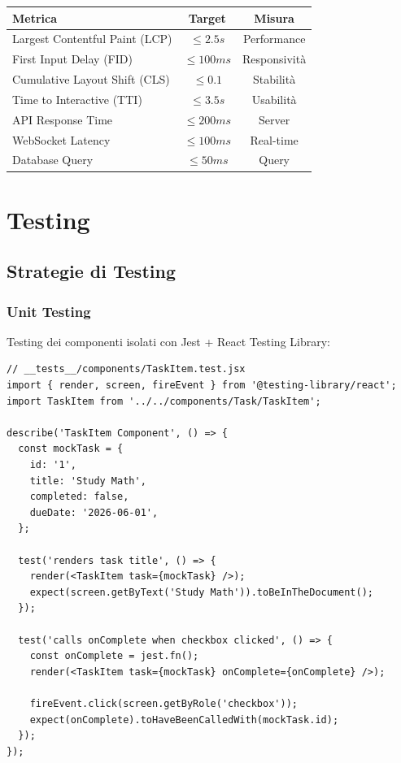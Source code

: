 \documentclass[12pt,a4paper]{report}
\begin{document}
\begin{table}[H]
    \centering
    \begin{tabular}{|l|c|c|}
        \hline
        \textbf{Metrica} & \textbf{Target} & \textbf{Misura} \\
        \hline
        Largest Contentful Paint (LCP) & $\leq 2.5s$ & Performance \\
        \hline
        First Input Delay (FID) & $\leq 100ms$ & Responsività \\
        \hline
        Cumulative Layout Shift (CLS) & $\leq 0.1$ & Stabilità \\
        \hline
        Time to Interactive (TTI) & $\leq 3.5s$ & Usabilità \\
        \hline
        API Response Time & $\leq 200ms$ & Server \\
        \hline
        WebSocket Latency & $\leq 100ms$ & Real-time \\
        \hline
        Database Query & $\leq 50ms$ & Query \\
        \hline
    \end{tabular}
\end{table}

\newpage

\chapter{Testing}

\section{Strategie di Testing}

\subsection{Unit Testing}

Testing dei componenti isolati con Jest + React Testing Library:

\begin{lstlisting}
// __tests__/components/TaskItem.test.jsx
import { render, screen, fireEvent } from '@testing-library/react';
import TaskItem from '../../components/Task/TaskItem';

describe('TaskItem Component', () => {
  const mockTask = {
    id: '1',
    title: 'Study Math',
    completed: false,
    dueDate: '2026-06-01',
  };
  
  test('renders task title', () => {
    render(<TaskItem task={mockTask} />);
    expect(screen.getByText('Study Math')).toBeInTheDocument();
  });
  
  test('calls onComplete when checkbox clicked', () => {
    const onComplete = jest.fn();
    render(<TaskItem task={mockTask} onComplete={onComplete} />);
    
    fireEvent.click(screen.getByRole('checkbox'));
    expect(onComplete).toHaveBeenCalledWith(mockTask.id);
  });
});
\end{lstlisting}
\end{document}
